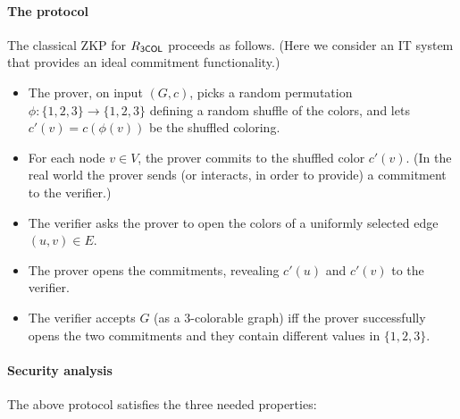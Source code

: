 \paragraph{The protocol}
The classical ZKP for $R_{\sf 3COL}$ proceeds as follows. 
(Here we consider an IT system that provides an ideal commitment functionality.)

\begin{itemize}
\item The prover, on input $(G,c)$, picks a random permutation $\phi:\{1,2,3\}\to\{1,2,3\}$ defining a random shuffle of the colors, and lets $c'(v)=c(\phi(v))$ be the shuffled coloring. 

\item For each node $v \in V$, the prover commits to the shuffled color $c'(v)$. (In the real world the prover sends (or interacts, in order to provide) a commitment to the verifier.)
\loosen

\item The verifier asks the prover to open the colors of a uniformly selected edge $(u,v)\in E$.

\item The prover opens the commitments, revealing $c'(u)$ and $c'(v)$ to the verifier.

\item The verifier accepts $G$ (as a 3-colorable graph) iff the prover successfully opens the two commitments and they contain different values in $\{1,2,3\}$. 
\end{itemize}




\paragraph{Security analysis}
The above protocol satisfies the three needed properties:

